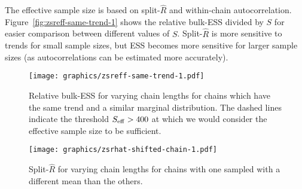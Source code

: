 \documentclass[american,]{article}
\theoremstyle{definition}
\begin{document}
The effective sample size is based on split-\(\widehat{R}\) and
within-chain autocorrelation. Figure~\ref{fig:zsreff-same-trend-1}
shows the relative bulk-ESS divided by \(S\) for easier
comparison between different values of \(S\).
%
Split-\(\widehat{R}\) is more sensitive to trends for
small sample sizes, but ESS becomes more sensitive for larger sample
sizes (as autocorrelations can be estimated more accurately).
\begin{figure}[tp]
  \centering
  \begin{minipage}{0.48\textwidth}
  \texttt{[image: graphics/zsreff-same-trend-1.pdf]}
  \caption{Relative bulk-ESS for varying chain lengths for chains which have
    the same trend and a similar marginal distribution. The dashed
    lines indicate the threshold \(S_{\rm eff} > 400\) at which we
    would consider the effective sample size to be sufficient.}
  \label{fig:zsreff-same-trend-1}
\end{minipage}
\hfill
  \begin{minipage}{0.48\textwidth}
  \texttt{[image: graphics/zsrhat-shifted-chain-1.pdf]}
  \caption{Split-\(\widehat{R}\) for varying chain lengths
    for chains with one sampled with a different mean than the others.\\~\\~}
  \label{fig:zsrhat-shifted-chain-1}
\end{minipage}
\end{figure}
\end{document}
